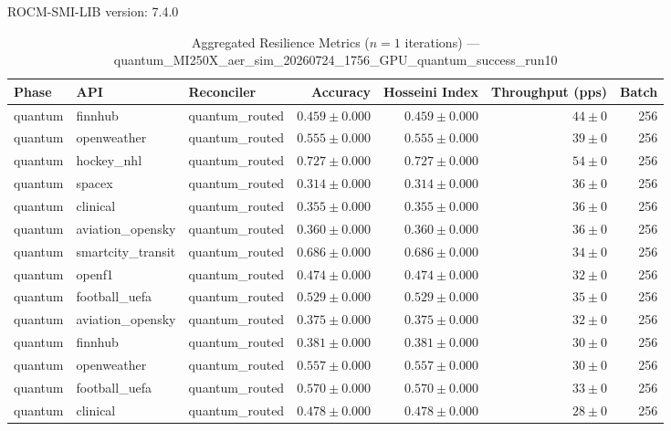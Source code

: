 ROCM-SMI-LIB version: 7.4.0

\begin{table}[htbp]
\caption{Aggregated Resilience Metrics ($n=1$ iterations) --- quantum_MI250X_aer_sim_20260724_1756_GPU_quantum_success_run10}
\begin{tabular}{l l l r r r r}
\hline
Phase & API & Reconciler & Accuracy & Hosseini Index & Throughput (pps) & Batch \\
\hline
quantum & finnhub & quantum\_routed & $0.459\pm0.000$ & $0.459\pm0.000$ & $44\pm0$ & 256 \\
quantum & openweather & quantum\_routed & $0.555\pm0.000$ & $0.555\pm0.000$ & $39\pm0$ & 256 \\
quantum & hockey\_nhl & quantum\_routed & $0.727\pm0.000$ & $0.727\pm0.000$ & $54\pm0$ & 256 \\
quantum & spacex & quantum\_routed & $0.314\pm0.000$ & $0.314\pm0.000$ & $36\pm0$ & 256 \\
quantum & clinical & quantum\_routed & $0.355\pm0.000$ & $0.355\pm0.000$ & $36\pm0$ & 256 \\
quantum & aviation\_opensky & quantum\_routed & $0.360\pm0.000$ & $0.360\pm0.000$ & $36\pm0$ & 256 \\
quantum & smartcity\_transit & quantum\_routed & $0.686\pm0.000$ & $0.686\pm0.000$ & $34\pm0$ & 256 \\
quantum & openf1 & quantum\_routed & $0.474\pm0.000$ & $0.474\pm0.000$ & $32\pm0$ & 256 \\
quantum & football\_uefa & quantum\_routed & $0.529\pm0.000$ & $0.529\pm0.000$ & $35\pm0$ & 256 \\
quantum & aviation\_opensky & quantum\_routed & $0.375\pm0.000$ & $0.375\pm0.000$ & $32\pm0$ & 256 \\
quantum & finnhub & quantum\_routed & $0.381\pm0.000$ & $0.381\pm0.000$ & $30\pm0$ & 256 \\
quantum & openweather & quantum\_routed & $0.557\pm0.000$ & $0.557\pm0.000$ & $30\pm0$ & 256 \\
quantum & football\_uefa & quantum\_routed & $0.570\pm0.000$ & $0.570\pm0.000$ & $33\pm0$ & 256 \\
quantum & clinical & quantum\_routed & $0.478\pm0.000$ & $0.478\pm0.000$ & $28\pm0$ & 256 \\

\end{tabular}
\end{table}
